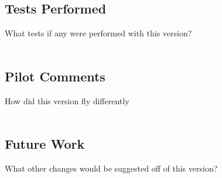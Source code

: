 \documentclass{article}
\begin{document}
\subsection*{Tests Performed}
What tests if any were performed with this version? \\ \\

\subsection*{Pilot Comments}
How did this version fly differently \\ \\

\subsection*{Future Work}
What other changes would be suggested off of this version? \\ \\
\end{document}
